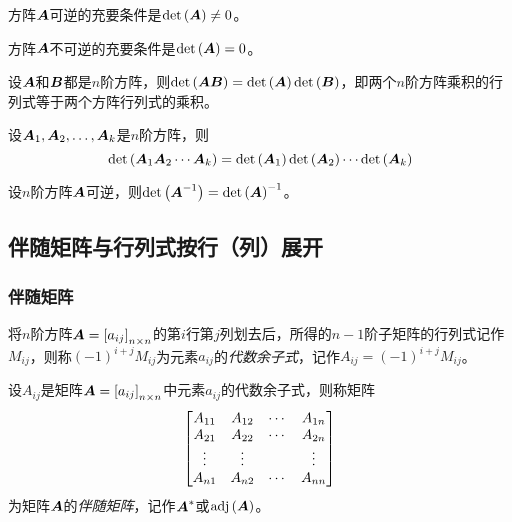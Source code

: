 \documentclass{ctexart}
\begin{document}
\begin{theorem}
    方阵\(\mata\)可逆的充要条件是\(\det{\mata}\neq0\)。
\end{theorem}

\begin{infer}
    方阵\(\mata\)不可逆的充要条件是\(\det{\mata}=0\)。
\end{infer}

\begin{property}
    设\(\mata\)和\(\matb\)都是\(n\)阶方阵，则\(\det{\mata\matb}=\det{\mata}\det{\matb}\)，即两个\(n\)阶方阵乘积的行列式等于两个方阵行列式的乘积。
\end{property}

\begin{infer}
    设\(\enums{\mata}{k}\)是\(n\)阶方阵，则
    \begin{equation*}
        \det{\mata_1\mata_2\cdots\mata_k}=\det{\mata_1}\det{\mata_2}\cdots\det{\mata_k}
    \end{equation*}
\end{infer}

\begin{property}
    设\(n\)阶方阵\(\mata\)可逆，则\(\det{\inv{\mata}}=\inv{\det{\mata}}\)。
\end{property}

\subsection{伴随矩阵与行列式按行（列）展开}

\subsubsection*{伴随矩阵}

\begin{definition}[代数余子式]
    将\(n\)阶方阵\(\mata=\mat{a_{ij}}_{n\times n}\)的第\(i\)行第\(j\)列划去后，所得的\(n-1\)阶子矩阵的行列式记作\(M_{ij}\)，则称\((-1)^{i+j}M_{ij}\)为元素\(a_{ij}\)的\emph{代数余子式}，记作\(A_{ij}=(-1)^{i+j}M_{ij}\)。
\end{definition}

\begin{definition}[伴随矩阵]
    设\(A_{ij}\)是矩阵\(\mata=\mat{a_{ij}}_{n\times n}\)中元素\(a_{ij}\)的代数余子式，则称矩阵
    \begin{equation*}
        \sqmat{bmatrix}{A}{n}
    \end{equation*}
    为矩阵\(\mata\)的\emph{伴随矩阵}，记作\(\mata^*\)或\(\adj{\mata}\)。
\end{definition}
\end{document}
